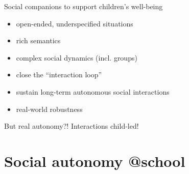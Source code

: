 \documentclass[xcolor=table]{beamer}
\begin{document}
\begin{frame}{Social companions to support children's well-being}
\begingroup
{}
            \begin{block}{}

                \begin{itemize}
                    \item open-ended, underspecified situations
                    \item  rich semantics
                    \item  complex social dynamics (incl. groups)
                    \item  close the ``interaction loop''
                    \item  sustain long-term autonomous social interactions
                    \item  real-world robustness

                \end{itemize}
            \end{block}
\endgroup

\pause
    \begin{center}
        But real autonomy?! Interactions child-led!

    \end{center}
\end{frame}

\section*{Social autonomy @school}

\end{document}
